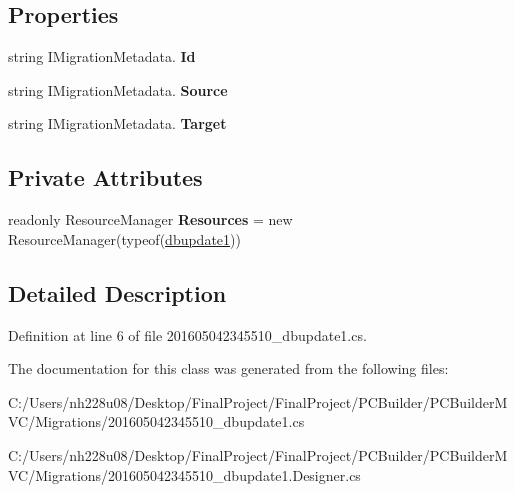 \subsection*{Properties}
\begin{DoxyCompactItemize}
\item 
string I\+Migration\+Metadata. {\bfseries Id}\hypertarget{class_p_c_builder_m_v_c_1_1_migrations_1_1dbupdate1_afd8913f5a916c8efa3b3ae38c6ccc16e}{}\label{class_p_c_builder_m_v_c_1_1_migrations_1_1dbupdate1_afd8913f5a916c8efa3b3ae38c6ccc16e}

\item 
string I\+Migration\+Metadata. {\bfseries Source}\hypertarget{class_p_c_builder_m_v_c_1_1_migrations_1_1dbupdate1_a1715c8c609433727839abed592e73a5e}{}\label{class_p_c_builder_m_v_c_1_1_migrations_1_1dbupdate1_a1715c8c609433727839abed592e73a5e}

\item 
string I\+Migration\+Metadata. {\bfseries Target}\hypertarget{class_p_c_builder_m_v_c_1_1_migrations_1_1dbupdate1_a359a47c990e68ea3cf87e97297ca5653}{}\label{class_p_c_builder_m_v_c_1_1_migrations_1_1dbupdate1_a359a47c990e68ea3cf87e97297ca5653}

\end{DoxyCompactItemize}
\subsection*{Private Attributes}
\begin{DoxyCompactItemize}
\item 
readonly Resource\+Manager {\bfseries Resources} = new Resource\+Manager(typeof(\hyperlink{class_p_c_builder_m_v_c_1_1_migrations_1_1dbupdate1}{dbupdate1}))\hypertarget{class_p_c_builder_m_v_c_1_1_migrations_1_1dbupdate1_a52d5952868fe61cb9dfc9770284097c3}{}\label{class_p_c_builder_m_v_c_1_1_migrations_1_1dbupdate1_a52d5952868fe61cb9dfc9770284097c3}

\end{DoxyCompactItemize}


\subsection{Detailed Description}


Definition at line 6 of file 201605042345510\+\_\+dbupdate1.\+cs.



The documentation for this class was generated from the following files\+:\begin{DoxyCompactItemize}
\item 
C\+:/\+Users/nh228u08/\+Desktop/\+Final\+Project/\+Final\+Project/\+P\+C\+Builder/\+P\+C\+Builder\+M\+V\+C/\+Migrations/201605042345510\+\_\+dbupdate1.\+cs\item 
C\+:/\+Users/nh228u08/\+Desktop/\+Final\+Project/\+Final\+Project/\+P\+C\+Builder/\+P\+C\+Builder\+M\+V\+C/\+Migrations/201605042345510\+\_\+dbupdate1.\+Designer.\+cs\end{DoxyCompactItemize}
